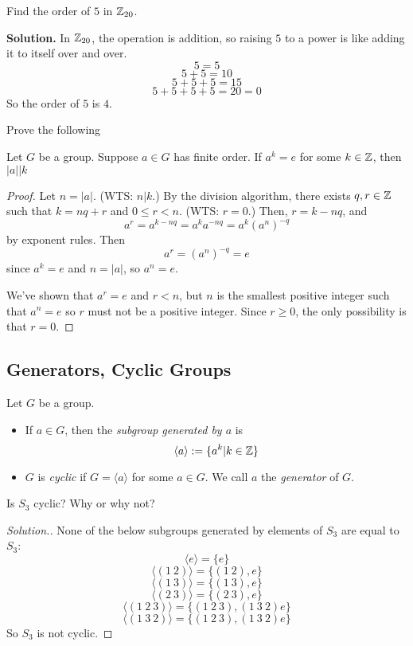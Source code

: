 \begin{example}
Find the order of $5$ in $\mathbb{Z}_{20}$.
\end{example}

\textbf{Solution.} 
In $\mathbb{Z}_{20}$, the operation is addition, so raising $5$ to a power is like adding it to itself over and over. 
\[5=5\]
\[5+5=10\]
\[5+5+5=15\]
\[5+5+5+5=20=0\]
So the order of $5$ is $4$.

\begin{example}
Prove the following
\begin{proposition}
Let $G$ be a group. Suppose $a\in G$ has finite order. If $a^k=e$ for some $k\in \mathbb{Z}$, then $|a| \big| k$
\end{proposition}
\end{example}
\begin{proof}
Let $n=|a|$. (WTS: $n|k$.) By the division algorithm, there exists $q,r\in \mathbb{Z}$ such that $k=nq+r$ and $0\leq r<n$. (WTS: $r=0$.) Then, $r=k-nq$, and \[a^r=a^{k-nq}=a^ka^{-nq}=a^k(a^n)^{-q}\] by exponent rules. Then \[a^r=(a^n)^{-q}=e\] since $a^k=e$ and $n=|a|$, so $a^n=e$. 
\medskip

We've shown that $a^r=e$ and $r<n$, but $n$ is the smallest positive integer such that $a^n=e$ so $r$ must not be a positive integer. Since $r\geq 0$, the only possibility is that $r=0$.
\end{proof}

\subsection{Generators, Cyclic Groups}

\begin{definition}
Let $G$ be a group.
\begin{itemize}
    \item If $a\in G$, then the \textit{subgroup generated by $a$} is 
    \[\langle a \rangle := \{a^k|k\in \mathbb{Z}\}\]
    \item $G$ is \textit{cyclic} if $G=\langle a \rangle$ for some $a\in G$. We call $a$ the \textit{generator} of $G$.
\end{itemize}
\end{definition}

\begin{example}
Is $S_3$ cyclic? Why or why not?
\end{example}
\begin{proof}[Solution.] None of the below subgroups generated by elements of $S_3$ are equal to $S_3$:
\[\langle e \rangle = \{e\}\]
\[\langle (1\ 2) \rangle = \{(1\ 2), e\}\]
\[\langle (1\ 3) \rangle = \{(1\ 3), e\}\]
\[\langle (2\ 3) \rangle = \{(2\ 3), e\}\]
\[\langle (1\ 2\ 3) \rangle = \{(1\ 2\ 3), (1\ 3\ 2)e\}\]
\[\langle (1\ 3\ 2)\rangle = \{(1\ 2\ 3), (1\ 3\ 2)e\}\]
So $S_3$ is not cyclic.
\end{proof}

